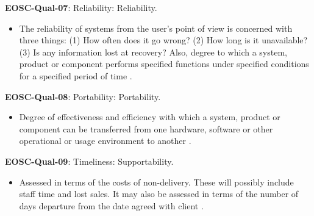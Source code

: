 \textbf{EOSC-Qual-07}: Reliability: Reliability.

\begin{itemize}
    \item The reliability of systems from the user's point of view is concerned with three things: (1) How often does it go wrong? (2) How long is it unavailable? (3) Is any information lost at recovery? Also, degree to which a system, product or component performs specified functions under specified conditions for a specified period of time \cite{iso_25010_2011_2017,gillies_modelling_1992,boehm_quantitative_1976}.
\end{itemize}




\textbf{EOSC-Qual-08}: Portability: Portability.

\begin{itemize}
    \item Degree of effectiveness and efficiency with which a system, product or component can be transferred from one hardware, software or other operational or usage environment to another \cite{iso_25010_2011_2017,gillies_modelling_1992,boehm_quantitative_1976,shepherdson_cessda_2019,raymond_software_2013}.
\end{itemize}

\textbf{EOSC-Qual-09}: Timeliness: Supportability.

\begin{itemize}
    \item Assessed in terms of the costs of non-delivery. These will possibly include staff time and lost sales. It may also be assessed in terms of the number of days departure from the date agreed with client \cite{gillies_modelling_1992}.
\end{itemize}


